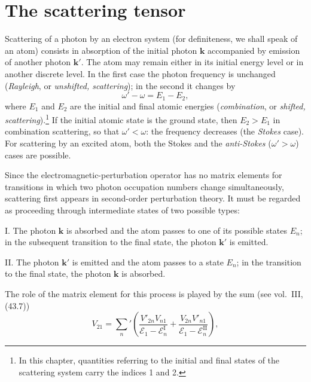 \section{The scattering tensor}

Scattering of a photon by an electron system (for definiteness, we shall speak of an atom) consists in absorption of the initial photon $\mathbf k$ accompanied by emission of another photon $\mathbf k'$. The atom may remain either in its initial energy level or in another discrete level. In the first case the photon frequency is unchanged (\emph{Rayleigh}, or \emph{unshifted, scattering}); in the second it changes by
\begin{equation}
\omega'-\omega=E_1-E_2,
\tag{59.1}
\end{equation}
where $E_1$ and $E_2$ are the initial and final atomic energies (\emph{combination}, or \emph{shifted, scattering}).\footnote{In this chapter, quantities referring to the initial and final states of the scattering system carry the indices 1 and 2.} If the initial atomic state is the ground state, then $E_2>E_1$ in combination scattering, so that $\omega'<\omega$: the frequency decreases (the \emph{Stokes} case). For scattering by an excited atom, both the Stokes and the \emph{anti-Stokes} ($\omega'>\omega$) cases are possible.

Since the electromagnetic-perturbation operator has no matrix elements for transitions in which two photon occupation numbers change simultaneously, scattering first appears in second-order perturbation theory. It must be regarded as proceeding through intermediate states of two possible types:

I. The photon $\mathbf k$ is absorbed and the atom passes to one of its possible states $E_n$; in the subsequent transition to the final state, the photon $\mathbf k'$ is emitted.

II. The photon $\mathbf k'$ is emitted and the atom passes to a state $E_n$; in the transition to the final state, the photon $\mathbf k$ is absorbed.

The role of the matrix element for this process is played by the sum (see vol.~III, (43.7))
\begin{equation}
V_{21}=\sum_n'\left(
\frac{V'_{2n}V_{n1}}{\mathcal E_1-\mathcal E_n^{\mathrm I}}
+\frac{V_{2n}V'_{n1}}{\mathcal E_1-\mathcal E_n^{\mathrm{II}}}
\right),
\tag{59.2}
\end{equation}

